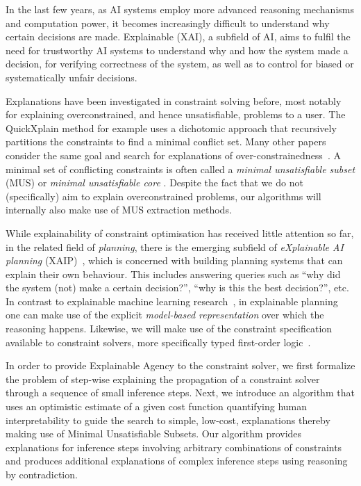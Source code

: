 In the last few years, as AI systems employ more advanced reasoning mechanisms and computation power, it becomes increasingly difficult to understand why certain decisions are made.
Explainable (XAI), a subfield of AI, aims to fulfil the need for trustworthy AI systems to understand why and how the system made a decision, for verifying correctness of the system, as well as to control for biased or systematically unfair decisions.

Explanations have been investigated in constraint solving before, most notably for explaining overconstrained, and hence unsatisfiable, problems to a user.
The QuickXplain method \cite{junker2001quickxplain} for example uses a dichotomic approach that recursively partitions the constraints to find a minimal conflict set. Many other papers consider the same goal and search for explanations of over-constrainedness~\cite{leo2017debugging,zeighami2018towards}.
A minimal set of conflicting constraints is often called a \emph{minimal unsatisfiable subset} (MUS) or \emph{minimal unsatisfiable core} \cite{marques2010minimal}. Despite the fact that we do not (specifically) aim to explain overconstrained problems, our algorithms will internally also make use of MUS extraction methods.

While explainability of constraint optimisation has received little attention so far, in the related field of \textit{planning}, there is the emerging subfield of \textit{eXplainable AI planning} (XAIP)~\cite{fox2017explainable}, which is concerned with building planning systems that can explain their own behaviour.
This includes answering queries such as ``why did the system (not) make a certain decision?'', ``why is this the best decision?'', etc. In contrast to explainable machine learning research~\cite{guidotti2018survey}, in explainable planning one can make use of the explicit \textit{model-based representation} over which the reasoning happens. 
Likewise, we will make use of the constraint specification available to constraint solvers, more specifically typed first-order logic~\cite{atcl/Wittocx13}.

In order to provide Explainable Agency to the constraint solver, we first formalize the problem of step-wise explaining the propagation of a constraint solver through a sequence of small inference steps.
Next, we introduce an algorithm that uses an optimistic estimate of a given cost function quantifying human interpretability to guide the search to simple, low-cost, explanations thereby making use of Minimal Unsatisfiable Subsets.
Our algorithm provides explanations for inference steps involving arbitrary combinations of constraints and produces additional explanations of complex inference steps using reasoning by contradiction.
